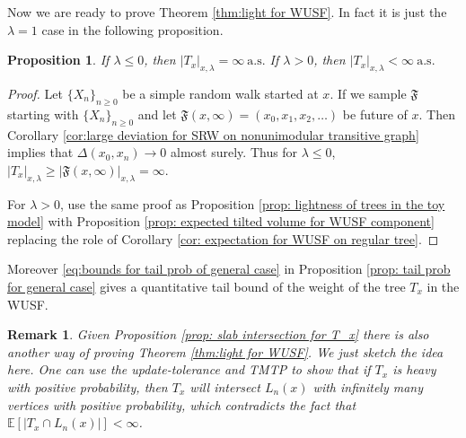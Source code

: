 \documentclass[12pt]{article}
\newtheorem{proposition}[theorem]{Proposition}
\newtheorem{remark}[theorem]{Remark}
\numberwithin{equation}{section}
\def\as {\mathrm{a.s.}}
\newcommand{\1}{\mathbf{1}}
\begin{document}
 
 
 Now we are ready to prove Theorem \ref{thm:light for WUSF}. In fact it is just the  $\lambda=1$  case in the following proposition. 
 \begin{proposition}\label{prop: when the tilted volume is finite}
 	If $\lambda\leq 0$, then $|T_x|_{x,\lambda}=\infty \ \as$
 	If $\lambda>0$, then $|T_x|_{x,\lambda}<\infty\  \as$  
 \end{proposition}
 \begin{proof}
 	
 	Let $\{X_n\}_{n\geq0}$ be a simple random walk started at $x$. If we sample $\mathfrak{F}$ starting with $\{X_n\}_{n\geq0}$ and let $\mathfrak{F}(x,\infty)=(x_0,x_1,x_2,\ldots)$ be future of $x$. Then Corollary \ref{cor:large deviation for SRW on nonunimodular transitive graph} implies that $\Delta(x_0,x_n)\rightarrow0$ almost surely. 
 	Thus for $\lambda\leq0 $, $|T_x|_{x,\lambda}\geq |\mathfrak{F}(x,\infty)|_{x,\lambda}=\infty$.
 	
 	For $\lambda>0$, use the same proof as Proposition \ref{prop: lightness of trees in the toy model} with Proposition  \ref{prop: expected tilted volume for WUSF component} replacing the role of Corollary \ref{cor: expectation for WUSF on regular tree}.	
 \end{proof}
  Moreover \eqref{eq:bounds for tail prob of general case} in Proposition \ref{prop: tail prob for general case} gives a quantitative tail bound of the weight of the tree $T_x$ in the WUSF. 

 \begin{remark}\label{rem: update-tolerance proof of the lightness}
 	Given Proposition \ref{prop: slab intersection for T_x} there is also another way of proving Theorem \ref{thm:light for WUSF}. We just sketch the idea here.  One can use the update-tolerance \cite{Tom2016wired} and TMTP to show that if $T_x$ is heavy with positive probability, then $T_x$ will intersect $L_n(x)$ with infinitely many vertices with positive probability, which contradicts the fact that $\mathbb{E}[|T_x\cap L_n(x)|]<\infty$.
 \end{remark}
 
 
\end{document}
